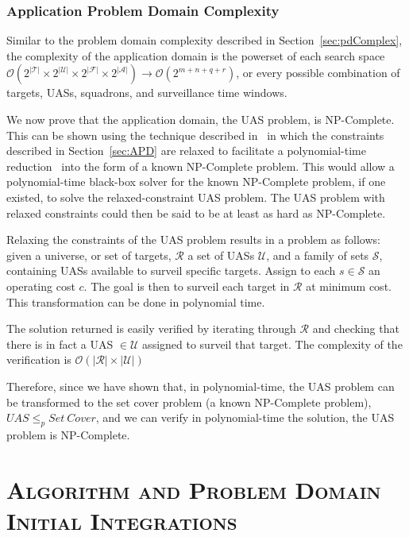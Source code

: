 \documentclass[conference]{IEEEtran}
\newcommand{\bigoh}[1]{\ensuremath{\mathcal{O}(#1)}}		%
\begin{document}
\subsubsection{Application Problem Domain Complexity}

Similar to the problem domain complexity described in
Section~\ref{sec:pdComplex}, the complexity of the application domain is the
powerset of each search space $\bigoh{2^{|\mathcal{T}|} \times
2^{|\mathcal{U}|} \times 2^{|\mathcal{F}|} \times 2^{|\mathcal{A}|}}
\rightarrow \bigoh{2^{m + n + q + r}}$, or every possible combination of
targets, UASs, squadrons, and surveillance time windows.

We now prove that the application domain, the UAS problem, is NP-Complete. This
can be shown using the technique described in~\cite{586textbook} in which the
constraints described in Section~\ref{sec:APD} are relaxed to facilitate a
polynomial-time reduction~\cite{wiki:polyReduction} into the form of a known
NP-Complete problem. This would allow a polynomial-time black-box solver for
the known NP-Complete problem, if one existed, to solve the relaxed-constraint
UAS problem. The UAS problem with relaxed constraints could then be said to be
at least as hard as NP-Complete.

Relaxing the constraints of the UAS problem results in a problem as follows:
given a universe, or set of targets, $\mathcal{R}$ a set of UASs $\mathcal{U}$,
and a family of sets $\mathcal{S}$, containing UASs available to surveil
specific targets. Assign to each $s \in \mathcal{S}$ an operating cost $c$. The
goal is then to surveil each target in $\mathcal{R}$ at minimum cost. This
transformation can be done in polynomial time.

The solution returned is easily verified by iterating through $\mathcal{R}$ and
checking that there is in fact a UAS $\in \mathcal{U}$ assigned to surveil that
target. The complexity of the verification is ${\bigoh{|\mathcal{R}| \times
|\mathcal{U}|}}$

Therefore, since we have shown that, in polynomial-time, the UAS problem can be
transformed to the set cover problem (a known NP-Complete problem),
${\mathit{UAS} \leq_p \mathit{Set\ Cover}}$, and we can verify in
polynomial-time the solution, the UAS problem is NP-Complete.

\section{\textsc{Algorithm and Problem Domain Initial Integrations}} \label{sec:initIntegration}
\end{document}
